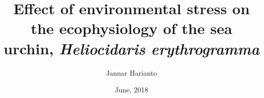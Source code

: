 

\makeglossaries


\title{Effect of environmental stress on the ecophysiology of the sea urchin, 
  \textit{Heliocidaris erythrogramma}}
\author{Januar Harianto}
\date{June, 2018}
